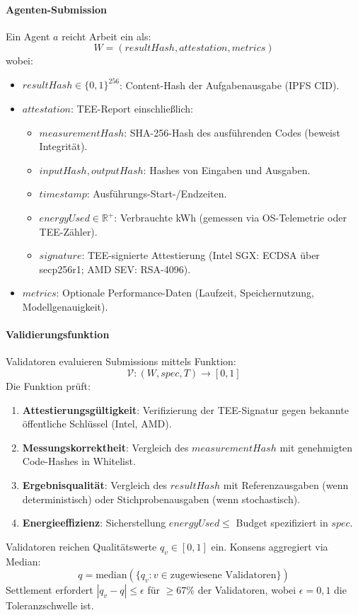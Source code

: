 \documentclass[11pt]{article}
\begin{document}
\paragraph{Agenten-Submission} Ein Agent $a$ reicht Arbeit ein als:
\begin{equation}
W = (resultHash, attestation, metrics)
\end{equation}
wobei:
\begin{itemize}[noitemsep]
  \item $resultHash \in \{0,1\}^{256}$: Content-Hash der Aufgabenausgabe (IPFS CID).
  \item $attestation$: TEE-Report einschließlich:
    \begin{itemize}[noitemsep]
      \item $measurementHash$: SHA-256-Hash des ausführenden Codes (beweist Integrität).
      \item $inputHash, outputHash$: Hashes von Eingaben und Ausgaben.
      \item $timestamp$: Ausführungs-Start-/Endzeiten.
      \item $energyUsed \in \mathbb{R}^+$: Verbrauchte kWh (gemessen via OS-Telemetrie oder TEE-Zähler).
      \item $signature$: TEE-signierte Attestierung (Intel SGX: ECDSA über secp256r1; AMD SEV: RSA-4096).
    \end{itemize}
  \item $metrics$: Optionale Performance-Daten (Laufzeit, Speichernutzung, Modellgenauigkeit).
\end{itemize}

\paragraph{Validierungsfunktion} Validatoren evaluieren Submissions mittels Funktion:
\begin{equation}
\mathcal{V}: (W, spec, T) \rightarrow [0, 1]
\end{equation}
Die Funktion prüft:
\begin{enumerate}[noitemsep]
  \item \textbf{Attestierungsgültigkeit}: Verifizierung der TEE-Signatur gegen bekannte öffentliche Schlüssel (Intel, AMD).
  \item \textbf{Messungskorrektheit}: Vergleich des $measurementHash$ mit genehmigten Code-Hashes in Whitelist.
  \item \textbf{Ergebnisqualität}: Vergleich des $resultHash$ mit Referenzausgaben (wenn deterministisch) oder Stichprobenausgaben (wenn stochastisch).
  \item \textbf{Energieeffizienz}: Sicherstellung $energyUsed \leq$ Budget spezifiziert in $spec$.
\end{enumerate}
Validatoren reichen Qualitätswerte $q_v \in [0,1]$ ein. Konsens aggregiert via Median:
\begin{equation}
q = \text{median}(\{q_v : v \in \text{zugewiesene Validatoren}\})
\end{equation}
Settlement erfordert $|q_v - q| \leq \epsilon$ für $\geq 67\%$ der Validatoren, wobei $\epsilon = 0,1$ die Toleranzschwelle ist.
\end{document}
